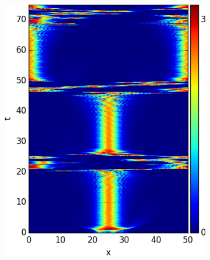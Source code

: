 \documentclass[mathserif, handout]{beamer}
\begin{document}
\begin{frame}[allowframebreaks]
\begin{figure}[h]
\begin{subfigure}{.23\linewidth}
    \includegraphics[width=\textwidth]{cqcglSliceUnwrappedReflectT75h005}
    \label{}
  \end{subfigure}
  \begin{subfigure}{.23\linewidth}
    \centering
    \captionsetup{justification=centering}
    \caption{}

\end{subfigure}
\end{figure}
\end{frame}
\end{document}
